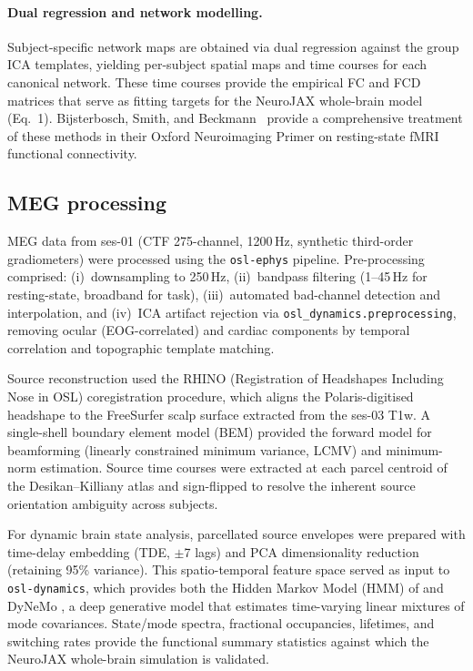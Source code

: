 \documentclass[11pt,a4paper]{article}\usepackage[]{graphicx}\usepackage[]{xcolor}
\begin{document}
\paragraph{Dual regression and network modelling.}
Subject-specific network maps are obtained via dual regression against
the group ICA templates, yielding per-subject spatial maps and time
courses for each canonical network. These time courses provide the
empirical FC and FCD matrices that serve as fitting targets for the
NeuroJAX whole-brain model (Eq.~1).
Bijsterbosch, Smith, and Beckmann~\citep{Bijsterbosch2017rsfmri}
provide a comprehensive treatment of these methods in their Oxford
Neuroimaging Primer on resting-state fMRI functional connectivity.

\subsection{MEG processing}

MEG data from ses-01 (CTF 275-channel, 1200\,Hz, synthetic
third-order gradiometers) were processed using the
\texttt{osl-ephys} pipeline. Pre-processing comprised:
(i)~downsampling to 250\,Hz, (ii)~bandpass filtering (1--45\,Hz for
resting-state, broadband for task), (iii)~automated bad-channel
detection and interpolation, and (iv)~ICA artifact rejection via
\texttt{osl\_dynamics.preprocessing}, removing ocular (EOG-correlated)
and cardiac components by temporal correlation and topographic
template matching.

Source reconstruction used the RHINO (Registration of Headshapes
Including Nose in OSL) coregistration procedure, which aligns the
Polaris-digitised headshape to the FreeSurfer scalp surface
extracted from the ses-03 T1w. A single-shell boundary element model
(BEM) provided the forward model for beamforming (linearly
constrained minimum variance, LCMV) and minimum-norm estimation.
Source time courses were extracted at each parcel centroid of the
Desikan--Killiany atlas and sign-flipped to resolve the inherent
source orientation ambiguity across subjects.

For dynamic brain state analysis, parcellated source envelopes were
prepared with time-delay embedding (TDE, $\pm$7 lags) and PCA
dimensionality reduction (retaining 95\% variance). This
spatio-temporal feature space served as input to
\texttt{osl-dynamics}, which provides both the Hidden Markov Model
(HMM) of \citet{Vidaurre2018hmm} and DyNeMo
\citep{Gohil2023dynemo}, a deep generative model that estimates
time-varying linear mixtures of mode covariances. State/mode spectra,
fractional occupancies, lifetimes, and switching rates provide the
functional summary statistics against which the NeuroJAX whole-brain
simulation is validated.
\end{document}
